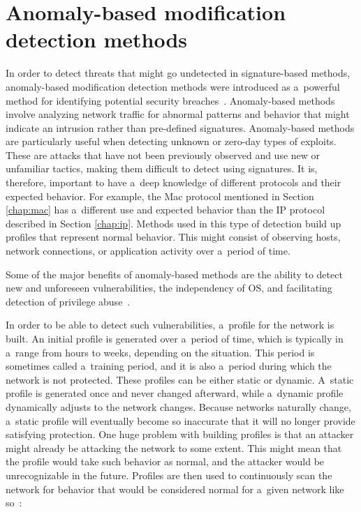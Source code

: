\documentclass[
  printed,     %
  color,       %
  oneside,     %
  nosansbold,  %
  nocolorbold, %
  nolof,         %
  nolot,         %
]{fithesis4}
\begin{document}
\section{Anomaly-based modification detection methods}

In order to detect threats that might go undetected in signature-based methods, anomaly-based modification detection methods were introduced as a~powerful method for identifying potential security breaches~\cite{gtidaps}. Anomaly-based methods involve analyzing network traffic for abnormal patterns and behavior that might indicate an intrusion rather than pre-defined signatures. Anomaly-based methods are particularly useful when detecting unknown or zero-day types of exploits. These are attacks that have not been previously observed and use new or unfamiliar tactics, making them difficult to detect using signatures. It is, therefore, important to have a~deep knowledge of different protocols and their expected behavior. For example, the Mac protocol mentioned in Section \ref{chap:mac} has a~different use and expected behavior than the IP protocol described in Section \ref{chap:ip}. Methods used in this type of detection build up profiles that represent normal behavior. This might consist of observing hosts, network connections, or application activity over a~period of time. 

Some of the major benefits of anomaly-based methods are the ability to detect new and unforeseen vulnerabilities, the independency of OS, and facilitating detection of privilege abuse~\cite{LIAO201316}. 

In order to be able to detect such vulnerabilities, a~profile for the network is built. An initial profile is generated over a~period of time, which is typically in a~range from hours to weeks, depending on the situation. This period is sometimes called a~training period, and it is also a~period during which the network is not protected. These profiles can be either static or dynamic. A~static profile is generated once and never changed afterward, while a~dynamic profile dynamically adjusts to the network changes. Because networks naturally change, a~static profile will eventually become so inaccurate that it will no longer provide satisfying protection. One huge problem with building profiles is that an attacker might already be attacking the network to some extent. This might mean that the profile would take such behavior as normal, and the attacker would be unrecognizable in the future. Profiles are then used to continuously scan the network for behavior that would be considered normal for a~given network like so~\cite{gtidaps}:
\end{document}
